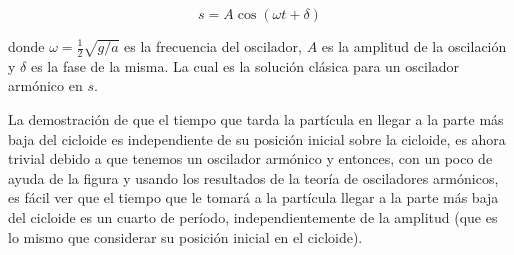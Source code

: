\documentclass[a4paper,10pt]{article}
\numberwithin{equation}{section}
\begin{document}
\begin{equation}
 s = A\cos{(\omega t + \delta)}
\end{equation}

donde $\omega = \frac{1}{2}\sqrt{g/a}$ es la frecuencia del oscilador, $A$ es la 
amplitud de la oscilación y $\delta$ es la fase de la misma. La cual es la solución
clásica para un oscilador armónico en $s$.

\vspace{.3cm}

La demostración de que el tiempo que tarda la partícula en llegar a la parte más baja 
del cicloide es independiente de su posición inicial sobre la cicloide, es ahora 
trivial debido a que tenemos un oscilador armónico y entonces, con un poco de ayuda 
de la figura  y usando los resultados de la teoría de 
osciladores armónicos, es fácil ver que el tiempo que le tomará a la partícula 
llegar a la parte más baja del cicloide es un cuarto de período, independientemente de 
la amplitud (que es lo mismo que considerar su posición inicial en el cicloide).
\end{document}
